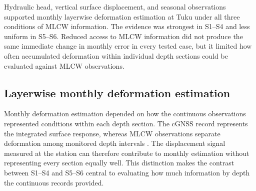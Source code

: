 
Hydraulic head, vertical surface displacement, and seasonal observations supported monthly layerwise deformation estimation at Tuku under all three conditions of MLCW information. The evidence was strongest in S1--S4 and less uniform in S5--S6. Reduced access to MLCW information did not produce the same immediate change in monthly error in every tested case, but it limited how often accumulated deformation within individual depth sections could be evaluated against MLCW observations.

\subsection{Layerwise monthly deformation estimation}
\label{subsec:discussion_layerwise_estimation}

Monthly deformation estimation depended on how the continuous observations represented conditions within each depth section. The cGNSS record represents the integrated surface response, whereas MLCW observations separate deformation among monitored depth intervals \citep{hung_measuring_2021}. The displacement signal measured at the station can therefore contribute to monthly estimation without representing every section equally well. This distinction makes the contrast between S1--S4 and S5--S6 central to evaluating how much information by depth the continuous records provided.

